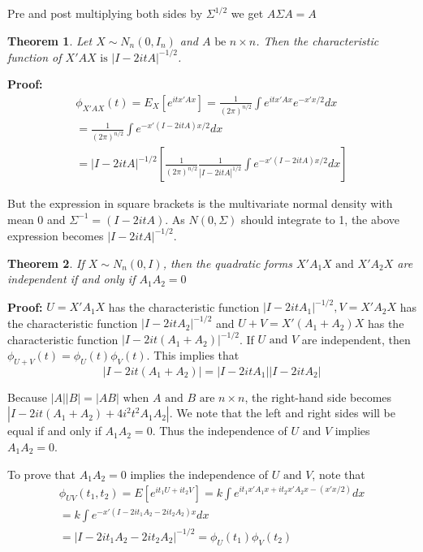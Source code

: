 \documentclass{article}
\newtheorem{theorem}{Theorem}[section]
\begin{document}
Pre and post multiplying both sides by \(\Sigma^{1/2}\) we get \(A\Sigma A=A\)

\begin{theorem}
    Let \(X\sim N_n(0,I_n)\) and \(A \text{ be } n \times n\). Then the characteristic function of \(X'AX \text{ is } |I-2itA|^{-1/2}\).
\end{theorem}

\textbf{Proof:}
\begin{equation*}
    \begin{split}
        \phi_{X'AX}(t)=E_X[e^{itx'Ax}]=\frac{1}{(2\pi)^{n/2}} \int e^{itx'Ax} e^{-x'x/2} dx\\
        =\frac{1}{(2\pi)^{n/2}} \int e^{-x'(I-2itA)x/2} dx\\
        =|I-2itA|^{-1/2} \left[\frac{1}{(2\pi)^{n/2}} \frac{1}{|I-2itA|^{1/2}} \int e^{-x'(I-2itA)x/2} dx \right]       
    \end{split}
\end{equation*}

But the expression in square brackets is the multivariate normal density with mean 0 and \(\Sigma^{-1}=(I-2itA)\). As \(N(0,\Sigma)\) should integrate to 1, the above expression becomes \(|I-2itA|^{-1/2}\).

\begin{theorem}
    If \(X\sim N_n(0,I)\), then the quadratic forms \(X'A_1X \text{ and } X'A_2X\) are independent if and only if \(A_1A_2=0\)
\end{theorem}

\textbf{Proof:} \(U=X'A_1X\) has the characteristic function \(|I-2itA_1|^{-1/2},V=X'A_2X\) has the characteristic function \(|I-2itA_2|^{-1/2}\) and \(U+V=X'(A_1+A_2)X\) has the characteristic function \(|I-2it(A_1+A_2)|^{-1/2}\). If \(U \text{ and } V\) are independent, then \(\phi_{U+V}(t)=\phi_U(t)\phi_V(t)\). This implies that
\begin{equation*}
    |I-2it(A_1+A_2)|=|I-2itA_1||I-2itA_2|
\end{equation*}

Because \(|A||B|=|AB| \text{ when } A \text{ and } B \text{ are } n \times n\), the right-hand side becomes \(|I-2it(A_1+A_2)+4i^2t^2A_1A_2|\). We note that the left and right sides will be equal if and only if \(A_1A_2=0\). Thus the independence of \(U \text{ and } V\) implies \(A_1A_2=0\).

To prove that \(A_1A_2=0\) implies the independence of \(U \text{ and } V\), note that
\begin{equation*}
    \begin{split}
        \phi_{UV}(t_1,t_2)=E \left[e^{it_1U+it_2V} \right]=k \int e^{it_1x'A_1x+i t_2 x'A_2x-(x'x/2)} dx\\
        = k \int e^{-x'(I-2it_1A_2-2it_2A_2)x} dx\\
        = |I-2it_1A_2-2it_2A_2|^{-1/2}=\phi_U(t_1)\phi_V(t_2)
    \end{split}
\end{equation*}
\end{document}

